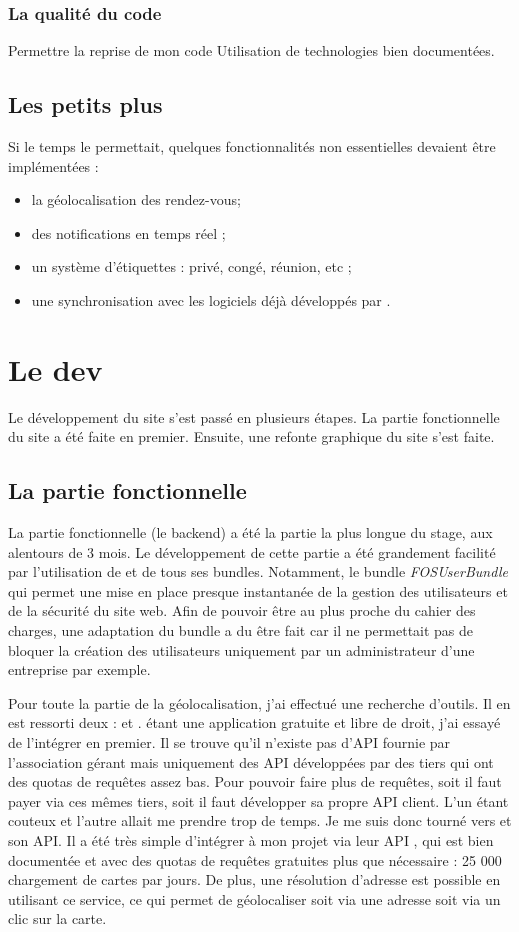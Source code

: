 \documentclass[a4paper, 11pt]{report}
\begin{document}
        \subsection{La qualité du code}
        Permettre la reprise de mon code
        Utilisation de technologies bien documentées.
    \section{Les petits plus}
    Si le temps le permettait, quelques fonctionnalités non essentielles devaient être implémentées :
    \begin{itemize}
        \item la géolocalisation des rendez-vous;
        \item des notifications en temps réel ;
        \item un système d'étiquettes : privé, congé, réunion, etc ;
        \item une synchronisation avec les logiciels déjà développés par \logilink.
    \end{itemize}

\chapter{Le dev}
Le développement du site \agenda s'est passé en plusieurs étapes. La partie fonctionnelle du site a été faite en premier. Ensuite, une refonte graphique du site s'est faite.
    \section{La partie fonctionnelle}
    La partie fonctionnelle (le backend) a été la partie la plus longue du stage, aux alentours de 3 mois. Le développement de cette partie a été grandement facilité par l'utilisation de \symfony et de tous ses bundles. Notamment, le bundle \textit{FOSUserBundle} qui permet une mise en place presque instantanée de la gestion des utilisateurs et de la sécurité du site web. Afin de pouvoir être au plus proche du cahier des charges, une adaptation du bundle a du être fait car il ne permettait pas de bloquer la création des utilisateurs uniquement par un administrateur d'une entreprise par exemple.

    Pour toute la partie de la géolocalisation, j'ai effectué une recherche d'outils. Il en est ressorti deux : \osm et \gmap. \osm étant une application gratuite et libre de droit, j'ai essayé de l'intégrer en premier. Il se trouve qu'il n'existe pas d'API fournie par l'association gérant \osm mais uniquement des API développées par des tiers qui ont des quotas de requêtes assez bas. Pour pouvoir faire plus de requêtes, soit il faut payer via ces mêmes tiers, soit il faut développer sa propre API client. L'un étant couteux et l'autre allait me prendre trop de temps. Je me suis donc tourné vers \gmap et son API. Il a été très simple d'intégrer \gmap à mon projet via leur API \javascript, qui est bien documentée et avec des quotas de requêtes gratuites plus que nécessaire : 25 000 chargement de cartes par jours. De plus, une résolution d'adresse est possible en utilisant ce service, ce qui permet de géolocaliser soit via une adresse soit via un clic sur la carte.
\end{document}
